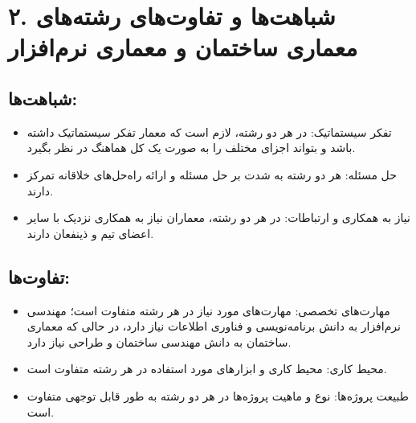 \section*{۲. شباهت‌ها و تفاوت‌های رشته‌های معماری ساختمان و معماری نرم‌افزار}
\subsection*{شباهت‌ها:}
\begin{itemize}
	\item تفکر سیستماتیک: در هر دو رشته، لازم است که معمار تفکر سیستماتیک داشته باشد و بتواند اجزای مختلف را به صورت یک کل هماهنگ در نظر بگیرد.
	\item حل مسئله: هر دو رشته به شدت بر حل مسئله و ارائه راه‌حل‌های خلاقانه تمرکز دارند.
	\item نیاز به همکاری و ارتباطات: در هر دو رشته، معماران نیاز به همکاری نزدیک با سایر اعضای تیم و ذینفعان دارند.
\end{itemize}

\subsection*{تفاوت‌ها:}
\begin{itemize}
	\item مهارت‌های تخصصی: مهارت‌های مورد نیاز در هر رشته متفاوت است؛ مهندسی نرم‌افزار به دانش برنامه‌نویسی و فناوری اطلاعات نیاز دارد، در حالی که معماری ساختمان به دانش مهندسی ساختمان و طراحی نیاز دارد.
	\item محیط کاری: محیط کاری و ابزارهای مورد استفاده در هر رشته متفاوت است.
	\item طبیعت پروژه‌ها: نوع و ماهیت پروژه‌ها در هر دو رشته به طور قابل توجهی متفاوت است.
\end{itemize}